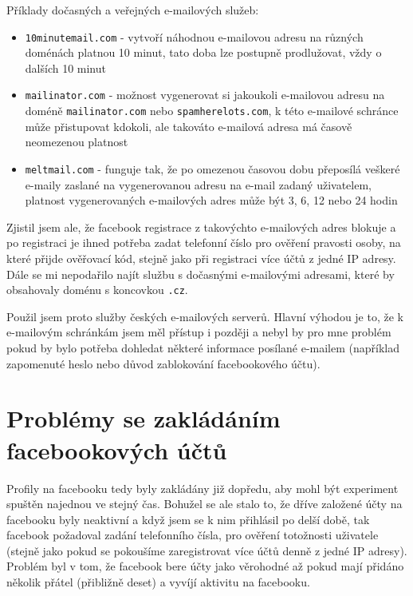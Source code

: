 \documentclass[thesis=M,czech]{FITthesis}[2013/05/10]
\begin{document}
Příklady dočasných a veřejných e-mailových služeb:

\begin{itemize}
  \item \verb|10minutemail.com| - vytvoří náhodnou e-mailovou adresu na různých doménách platnou 10 minut, tato doba lze postupně prodlužovat, vždy o dalších 10 minut
  \item \verb|mailinator.com| - možnost vygenerovat si jakoukoli e-mailovou adresu na doméně \verb|mailinator.com| nebo \verb|spamherelots.com|, k této e-mailové schránce může přistupovat kdokoli, ale takováto e-mailová adresa má časově neomezenou platnost
  \item \verb|meltmail.com| - funguje tak, že po omezenou časovou dobu přeposílá veškeré e-maily zaslané na vygenerovanou adresu na e-mail zadaný uživatelem, platnost vygenerovaných e-mailových adres může být 3, 6, 12 nebo 24 hodin
\end{itemize}

Zjistil jsem ale, že facebook registrace z takovýchto e-mailových adres blokuje a po registraci je ihned potřeba zadat telefonní číslo pro ověření pravosti osoby, na které přijde ověřovací kód, stejně jako při registraci více účtů z jedné IP adresy. Dále se mi nepodařilo najít službu s dočasnými e-mailovými adresami, které by obsahovaly doménu s koncovkou \verb|.cz|. 

Použil jsem proto služby českých e-mailových serverů. Hlavní výhodou je to, že k e-mailovým schránkám jsem měl přístup i později a nebyl by pro mne problém pokud by bylo potřeba dohledat některé informace posílané e-mailem (například zapomenuté heslo nebo důvod zablokování facebookového účtu).

\section{Problémy se zakládáním facebookových účtů}

Profily na facebooku tedy byly zakládány již dopředu, aby mohl být experiment spuštěn najednou ve stejný čas. Bohužel se ale stalo to, že dříve založené účty na facebooku byly neaktivní a když jsem se k nim přihlásil po delší době, tak facebook požadoval zadání telefonního čísla, pro ověření totožnosti uživatele (stejně jako pokud se pokoušíme zaregistrovat více účtů denně z jedné IP adresy). Problém byl v tom, že facebook bere účty jako věrohodné až pokud mají přidáno několik přátel (přibližně deset) a vyvíjí aktivitu na facebooku. 
\end{document}
